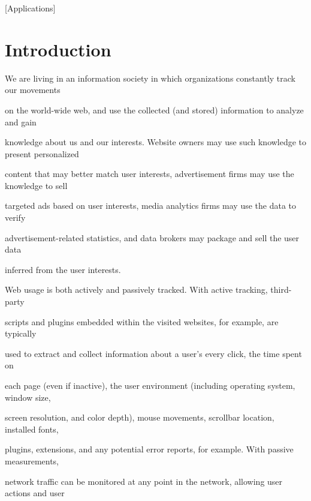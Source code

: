\documentclass{sig-alternate-10pt}
\begin{document}
[Applications] 













\section{Introduction}



We are living in an information society in which organizations constantly track our movements 

on the world-wide web, and use the collected (and stored) information to analyze and gain 

knowledge about us and our interests.  Website owners may use such knowledge to present personalized 

content that may better match user interests, advertisement firms may use the knowledge to sell 

targeted ads based on user interests, media analytics firms may use the data to verify 

advertisement-related statistics, and data brokers may package and sell the user data 

inferred from the user interests.



Web usage is both actively and passively tracked.  With active tracking, third-party 

scripts and plugins embedded within the visited websites, for example, are typically 

used to extract and collect information about a user's every click, the time spent on 

each page (even if inactive), the user environment (including operating system, window size, 

screen resolution, and color depth), mouse movements, scrollbar location, installed fonts, 

plugins, extensions, and any potential error reports, for example.  With passive measurements, 

network traffic can be monitored at any point in the network, allowing user actions and user 
\end{document}
